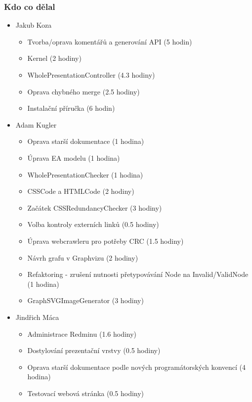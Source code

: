 \documentclass{beamer}
\begin{document}
\begin{frame}[allowframebreaks]\frametitle{Kdo co dělal} 
  \begin{itemize}
    \item Jakub Koza
      \begin{itemize}
       		 \item Tvorba/oprava komentářů a generování API (5 hodin)
			 \item Kernel (2 hodiny)
			 \item WholePresentationController (4.3 hodiny)
			 \item Oprava chybného merge (2.5 hodiny)
			 \item Instalační příručka (6 hodin)
     \end{itemize}

    \item Adam Kugler
      \begin{itemize}
       \item Oprava starší dokumentace (1 hodina)
			 \item Úprava EA modelu (1 hodina)
       \item WholePresentationChecker (1 hodina)
			 \item CSSCode a HTMLCode (2 hodiny)
       \item Začátek CSSRedundancyChecker (3 hodiny)
       \item Volba kontroly externích linků (0.5 hodiny)
			 \item Úprava webcrawleru pro potřeby CRC (1.5 hodiny)
			 \item Návrh grafu v Graphvizu (2 hodiny)
       \item Refaktoring - zrušení nutnosti přetypovávání Node na Invalid/ValidNode (1 hodina)
			 \item GraphSVGImageGenerator (3 hodiny)
     \end{itemize}

    \item Jindřich Máca
      \begin{itemize}
       \item Administrace Redminu (1.6 hodiny)
			 \item Dostylování prezentační vrstvy (0.5 hodiny)
			 \item Oprava starší dokumentace podle nových programátorských konvencí (4 hodina)
			 \item Testovací webová stránka (0.5 hodiny)
     \end{itemize}


\end{itemize}
\end{frame}
\end{document}
